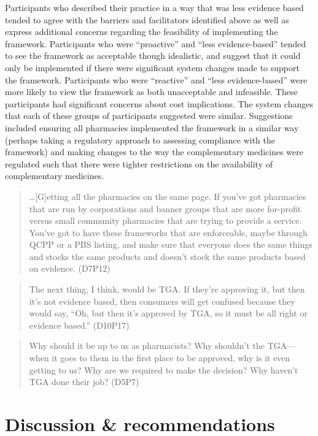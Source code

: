 \documentclass[11pt,a4paper]{article}
\begin{document}
Participants who described their practice in a way that was less
evidence based tended to agree with the barriers and facilitators
identified above as well as express additional concerns regarding the
feasibility of implementing the framework. Participants who were
``proactive'' and ``less evidence-based'' tended to see the framework as
acceptable though idealistic, and suggest that it could only be
implemented if there were significant system changes made to support the
framework. Participants who were ``reactive'' and ``less
evidence-based'' were more likely to view the framework as both
unacceptable and infeasible. These participants had significant concerns
about cost implications. The system changes that each of these groups of
participants suggested were similar. Suggestions included ensuring all
pharmacies implemented the framework in a similar way (perhaps taking a
regulatory approach to assessing compliance with the framework) and
making changes to the way the complementary medicines were regulated
such that there were tighter restrictions on the availability of
complementary medicines.

\begin{quote}
\ldots{}{[}G{]}etting all the pharmacies on the same page. If you've got
pharmacies that are run by corporations and banner groups that are more
for-profit versus small community pharmacies that are trying to provide
a service. You've got to have these frameworks that are enforceable,
maybe through QCPP or a PBS listing, and make sure that everyone does
the same things and stocks the same products and doesn't stock the same
products based on evidence. (D7P12)
\end{quote}

\begin{quote}
The next thing, I think, would be TGA. If they're approving it, but then
it's not evidence based, then consumers will get confused because they
would say, ``Oh, but then it's approved by TGA, so it must be all right
or evidence based.'' (D10P17)
\end{quote}

\begin{quote}
Why should it be up to us as pharmacists? Why shouldn't the TGA---when
it goes to them in the first place to be approved, why is it even
getting to us? Why are we required to make the decision? Why haven't TGA
done their job? (D5P7)
\end{quote}

\section{Discussion \&
recommendations}\label{discussion-recommendations}
\end{document}
